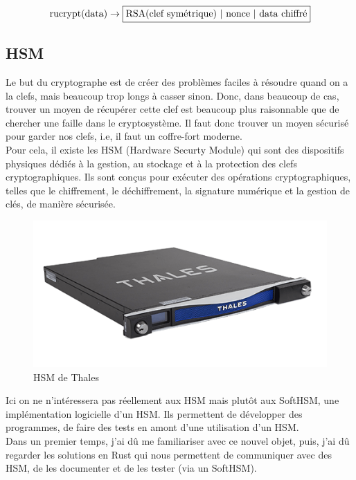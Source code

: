 \documentclass[a4paper, 12pt]{article}
\begin{document}
$$
\text{rucrypt(data)} \rightarrow \fbox{RSA(clef symétrique) | nonce | data chiffré}
$$
\subsection{HSM} \label{HSMsec}

Le but du cryptographe est de créer des problèmes faciles à résoudre quand on a la clefs, mais beaucoup trop longs à casser sinon. Donc, dans beaucoup de cas, trouver un moyen de récupérer cette clef est beaucoup plus raisonnable que de chercher une faille dans le cryptosystème. Il faut donc trouver un moyen sécurisé pour garder nos clefs, i.e, il faut un coffre-fort moderne. \\

Pour cela, il existe les HSM (Hardware Securty Module) qui sont des dispositifs physiques dédiés à la gestion, au stockage et à la protection des clefs cryptographiques. Ils sont conçus pour exécuter des opérations cryptographiques, telles que le chiffrement, le déchiffrement, la signature numérique et la gestion de clés, de manière sécurisée.


\begin{figure}[h]
	\centering
	\includegraphics[width=.7\textwidth]{img/hsm.png}
	\caption{HSM de Thales}
	\label{hsmthales}
\end{figure}

Ici on ne n'intéressera pas réellement aux HSM mais plutôt aux SoftHSM, une implémentation logicielle d'un HSM. Ils permettent de développer des programmes, de faire des tests en amont d'une utilisation d'un HSM. \\

Dans un premier temps, j'ai dû me familiariser avec ce nouvel objet, puis, j'ai dû regarder les solutions en Rust qui nous permettent de communiquer avec des HSM, de les documenter et de les tester (via un SoftHSM). \\
\end{document}
